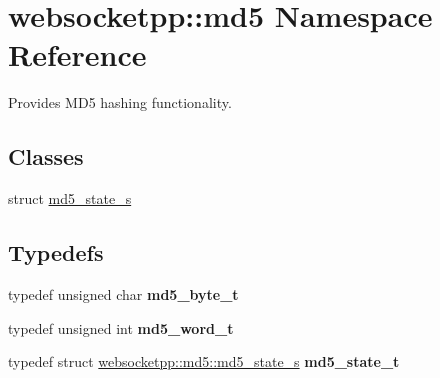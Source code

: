 \hypertarget{namespacewebsocketpp_1_1md5}{}\section{websocketpp\+:\+:md5 Namespace Reference}
\label{namespacewebsocketpp_1_1md5}


Provides M\+D5 hashing functionality.  


\subsection*{Classes}
\begin{DoxyCompactItemize}
\item 
struct \mbox{\hyperlink{structwebsocketpp_1_1md5_1_1md5__state__s}{md5\+\_\+state\+\_\+s}}
\end{DoxyCompactItemize}
\subsection*{Typedefs}
\begin{DoxyCompactItemize}
\item 
\mbox{\label{namespacewebsocketpp_1_1md5_a0c434041715d244182207c3413e36e71}} 
typedef unsigned char {\bfseries md5\+\_\+byte\+\_\+t}
\item 
\mbox{\label{namespacewebsocketpp_1_1md5_a0ece422ac11bb1332dcf342ced42ac96}} 
typedef unsigned int {\bfseries md5\+\_\+word\+\_\+t}
\item 
\mbox{\label{namespacewebsocketpp_1_1md5_a4be84c20ee3f9d9c76d4e2f7befe2eff}} 
typedef struct \mbox{\hyperlink{structwebsocketpp_1_1md5_1_1md5__state__s}{websocketpp\+::md5\+::md5\+\_\+state\+\_\+s}} {\bfseries md5\+\_\+state\+\_\+t}
\end{DoxyCompactItemize}
